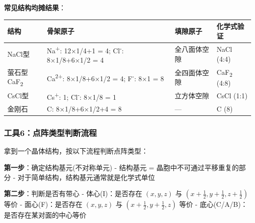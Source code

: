 \textbf{常见结构均摊结果}：

{\def\LTcaptype{none} %
\begin{longtable}[]{@{}
  >{\raggedright\arraybackslash}p{}
  >{\raggedright\arraybackslash}p{}
  >{\raggedright\arraybackslash}p{}
  >{\raggedright\arraybackslash}p{}@{}}
\toprule\noalign{}
\begin{minipage}[b]{\linewidth}\raggedright
结构
\end{minipage} & \begin{minipage}[b]{\linewidth}\raggedright
骨架原子
\end{minipage} & \begin{minipage}[b]{\linewidth}\raggedright
填隙原子
\end{minipage} & \begin{minipage}[b]{\linewidth}\raggedright
化学式验证
\end{minipage} \\
\midrule\noalign{}
\endhead
\bottomrule\noalign{}
\endlastfoot
NaCl型 & Na\textsuperscript{+}: 12×1/4+1 = 4; Cl\textsuperscript{-}: 8×1/8+6×1/2 = 4 & 全八面体空隙 & NaCl (4:4) \\
萤石型CaF\textsubscript{2} & Ca\textsuperscript{2+}: 8×1/8+6×1/2 = 4; F\textsuperscript{-}: 8×1 = 8 & 全四面体空隙 & CaF\textsubscript{2} (4:8) \\
CsCl型 & Cs\textsuperscript{+}: 1; Cl\textsuperscript{-}: 8×1/8 = 1 & 立方体空隙 & CsCl (1:1) \\
金刚石 & C: 8×1/8+6×1/2+4 = 8 & --- & C (8) \\
\end{longtable}
}

\subsubsection{工具6：点阵类型判断流程}\label{ux5de5ux51776ux70b9ux9635ux7c7bux578bux5224ux65adux6d41ux7a0b}

拿到一个晶体结构，按以下流程判断点阵类型：

\textbf{第一步}：确定结构基元(不对称单元)
- 结构基元 = 晶胞中不可通过平移重复的部分
- 对于简单结构，结构基元通常就是化学式单位

\textbf{第二步}：判断是否有带心
- 体心(I)：是否存在 \((x,y,z)\) 与 \((x+\frac{1}{2}, y+\frac{1}{2}, z+\frac{1}{2})\) 等价
- 面心(F)：是否存在 \((x,y,z)\) 与 \((x+\frac{1}{2}, y+\frac{1}{2}, z)\) 等价
- 底心(C/A/B)：是否存在某对面的中心等价

